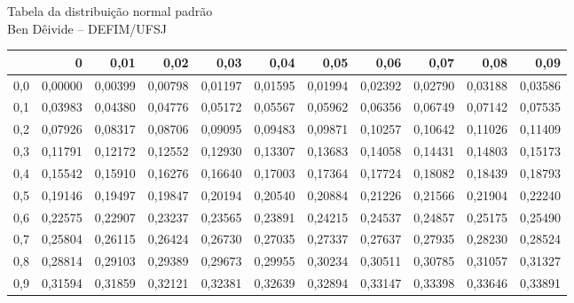 \documentclass[a4paper]{article}
\begin{document}

 
\begin{center}
{\Large Tabela da distribui\c{c}\~{a}o normal padr\~{a}o}\\ \vspace{2ex}
{\large Ben D\^eivide -- DEFIM/UFSJ}  \\
\end{center}
 
 
 
\begin{center}
\end{center}
 
\begin{center}
\small\addtolength{\tabcolsep}{-3pt}
{\footnotesize
\begin{tabular}{rrrrrrrrrrr}
  \hline
 & 0 & 0,01 & 0,02 & 0,03 & 0,04 & 0,05 & 0,06 & 0,07 & 0,08 & 0,09 \\ 
  \hline
0,0 & 0,00000 & 0,00399 & 0,00798 & 0,01197 & 0,01595 & 0,01994 & 0,02392 & 0,02790 & 0,03188 & 0,03586 \\ 
  0,1 & 0,03983 & 0,04380 & 0,04776 & 0,05172 & 0,05567 & 0,05962 & 0,06356 & 0,06749 & 0,07142 & 0,07535 \\ 
  0,2 & 0,07926 & 0,08317 & 0,08706 & 0,09095 & 0,09483 & 0,09871 & 0,10257 & 0,10642 & 0,11026 & 0,11409 \\ 
  0,3 & 0,11791 & 0,12172 & 0,12552 & 0,12930 & 0,13307 & 0,13683 & 0,14058 & 0,14431 & 0,14803 & 0,15173 \\ 
  0,4 & 0,15542 & 0,15910 & 0,16276 & 0,16640 & 0,17003 & 0,17364 & 0,17724 & 0,18082 & 0,18439 & 0,18793 \\ 
  0,5 & 0,19146 & 0,19497 & 0,19847 & 0,20194 & 0,20540 & 0,20884 & 0,21226 & 0,21566 & 0,21904 & 0,22240 \\ 
  0,6 & 0,22575 & 0,22907 & 0,23237 & 0,23565 & 0,23891 & 0,24215 & 0,24537 & 0,24857 & 0,25175 & 0,25490 \\ 
  0,7 & 0,25804 & 0,26115 & 0,26424 & 0,26730 & 0,27035 & 0,27337 & 0,27637 & 0,27935 & 0,28230 & 0,28524 \\ 
  0,8 & 0,28814 & 0,29103 & 0,29389 & 0,29673 & 0,29955 & 0,30234 & 0,30511 & 0,30785 & 0,31057 & 0,31327 \\ 
  0,9 & 0,31594 & 0,31859 & 0,32121 & 0,32381 & 0,32639 & 0,32894 & 0,33147 & 0,33398 & 0,33646 & 0,33891 \\ 

\end{tabular}}
\end{center}
\end{document}
